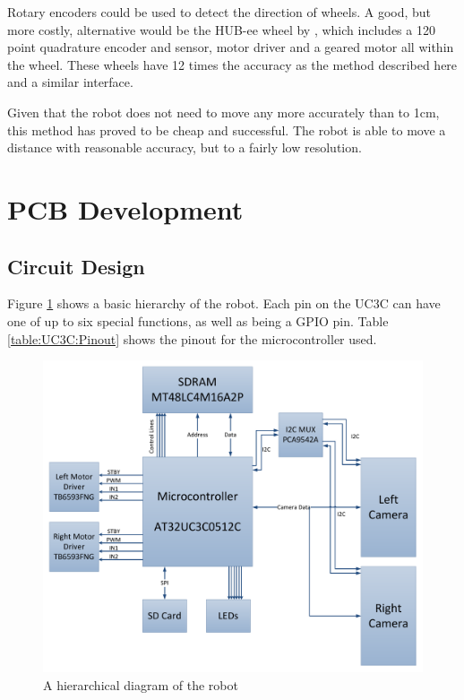 Rotary encoders could be used to detect the direction of wheels. A good, but more costly, alternative would be the HUB-ee wheel by \cite{Creative_Robotics}, which includes a 120 point quadrature encoder and sensor, motor driver and a geared motor all within the wheel. These wheels have 12 times the accuracy as the method described here and a similar interface. 
 
Given that the robot does not need to move any more accurately than to 1cm, this method has proved to be cheap and successful. The robot is able to move a distance with reasonable accuracy, but to a fairly low resolution.

\section{PCB Development}\label{Section:PCB_Dev}
\subsection{Circuit Design}

Figure \ref{fig:Hierarchical} shows a basic hierarchy of the robot. Each pin on the UC3C can have one of up to six special functions, as well as being a GPIO pin.  Table \ref{table:UC3C:Pinout} shows the pinout for the microcontroller used. 
\begin{figure}
\includegraphics[width=\textwidth]{Figures/hierarchy.pdf}
\caption{A hierarchical diagram of the robot}
\label{fig:Hierarchical}
\end{figure}

